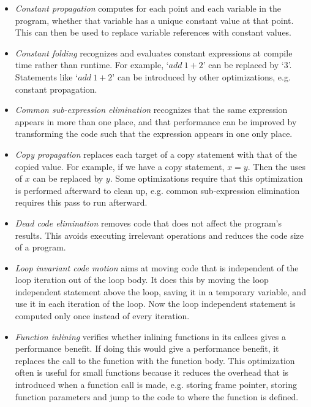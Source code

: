 \begin{itemize}
\item \emph{Constant propagation} computes for each point and each variable in the program, whether that variable has a unique constant value at that point. This can then be used to replace variable references with constant values.
\item \emph{Constant folding} recognizes and evaluates constant expressions at compile time rather than runtime. For example, `$add\ 1+2$' can be replaced by `$3$'. Statements like `$add\ 1+2$' can be introduced by other optimizations, e.g. constant propagation. 
\item \emph{Common sub-expression elimination} recognizes that the same expression appears in more than one place, and that performance can be improved by transforming the code such that the expression appears in one only place.
\item \emph{Copy propagation} replaces each target of a copy statement with that of the copied value. For example, if we have a copy statement, $x = y$. Then the uses of $x$ can be replaced by $y$. Some optimizations require that this optimization is performed afterward to clean up, e.g. common sub-expression elimination requires this pass to run afterward. 
\item \emph{Dead code elimination} removes code that does not affect the program's results. This avoids executing irrelevant operations and reduces the code size of a program.  
\item \emph{Loop invariant code motion} aims at moving code that is independent of the loop iteration out of the loop body. It does this by moving the loop independent statement above the loop, saving it in a temporary variable, and use it in each iteration of the loop. Now the loop independent statement is computed only once instead of every iteration. 
\item \emph{Function inlining} verifies whether inlining functions in its callees gives a performance benefit. If doing this would give a performance benefit, it replaces the call to the function with the function body. This optimization often is useful for small functions because it reduces the overhead that is introduced when a function call is made, e.g. storing frame pointer, storing function parameters and jump to the code to where the function is defined.     
\end{itemize}

